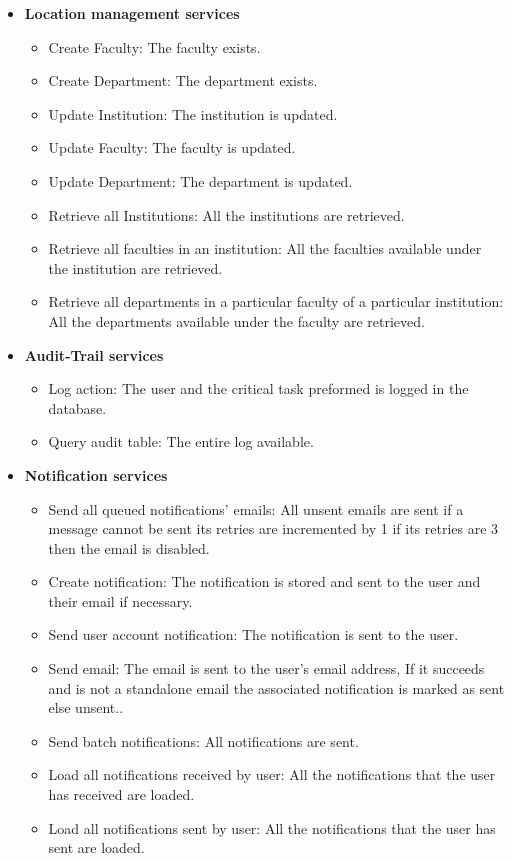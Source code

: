 \documentclass[12pt]{article}
\begin{document}
\begin{itemize}
	\item \textbf{Location management services}
		\begin{itemize}
			\item Create Faculty: The faculty exists.
			\item Create Department: The department exists.
			\item Update Institution: The institution is updated.
			\item Update Faculty: The faculty is updated. 	
			\item Update Department: The department is updated. 
			\item Retrieve all Institutions: All the institutions are retrieved.
			\item Retrieve all faculties in an institution: All the faculties available under the institution are retrieved.
			\item Retrieve all departments in a particular faculty of a particular institution: All the departments available under the faculty are retrieved.	 						
		\end{itemize}
	
	\item \textbf{Audit-Trail services}
		\begin{itemize}
			\item Log action: The user and the critical task preformed is logged in the database.
			\item Query audit table: The entire log available.										
		\end{itemize}
	
	\item \textbf{Notification services}
		\begin{itemize}
			\item Send all queued notifications' emails: All unsent emails are sent if a message cannot be sent its retries are incremented by 1 if its retries are 3 then the email is disabled.
			\item Create notification: The notification is stored and sent to the user and their email if necessary.				
			\item Send user account notification: The notification is sent to the user.
			\item Send email: The email is sent to the user's email address, If it succeeds and is not a standalone email the associated notification is marked as sent else unsent..
			\item Send batch notifications: All notifications are sent.
			\item Load all notifications received by user: All the notifications that the user has received are loaded.
			\item Load all notifications sent by user: All the notifications that the user has sent are loaded.	
		\end{itemize}
	

\end{itemize}
\end{document}
